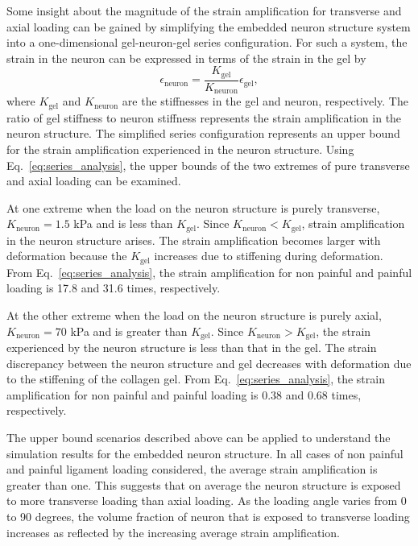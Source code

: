 \documentclass[]{interact}
\begin{document}
Some insight about the magnitude of the strain amplification for transverse and axial loading can be gained by simplifying the embedded neuron structure system into a one-dimensional gel-neuron-gel series configuration. For such a system, the strain in the neuron can be expressed in terms of the strain in the gel by
%
\begin{equation}
\epsilon_{\text{neuron}} = \frac{K_{\text{gel}}}{K_{\text{neuron}}}\epsilon_{\text{gel}},
\label{eq:series_analysis}
\end{equation}
%
where $K_{\text{gel}}$ and $K_{\text{neuron}}$ are the stiffnesses in the gel and neuron, respectively. The ratio of gel stiffness to neuron stiffness represents the strain amplification in the neuron structure. The simplified series configuration represents an upper bound for the strain amplification experienced in the neuron structure. Using Eq.\ \ref{eq:series_analysis}, the upper bounds of the two extremes of pure transverse and axial loading can be examined. 

At one extreme when the load on the neuron structure is purely transverse, $K_{\text{neuron}} = 1.5$ kPa and is less than $K_{\text{gel}}$. Since $K_{\text{neuron}} < K_{\text{gel}}$, strain amplification in the neuron structure arises. The strain amplification becomes larger with deformation because the $K_{\text{gel}}$ increases due to stiffening during deformation. From Eq.\ \eqref{eq:series_analysis}, the strain amplification for non painful and painful loading is 17.8 and 31.6 times, respectively.

At the other extreme when the load on the neuron structure is purely axial, $K_{\text{neuron}} = 70$ kPa and is greater than $K_{\text{gel}}$. Since $K_{\text{neuron}} > K_{\text{gel}}$, the strain experienced by the neuron structure is less than that in the gel. The strain discrepancy between the neuron structure and gel decreases with deformation due to the stiffening of the collagen gel. From Eq.\ \eqref{eq:series_analysis}, the strain amplification for non painful and painful loading is 0.38 and 0.68 times, respectively.

The upper bound scenarios described above can be applied to understand the simulation results for the embedded neuron structure. In all cases of non painful and painful ligament loading considered, the average strain amplification is greater than one. This suggests that on average the neuron structure is exposed to more transverse loading than axial loading. As the loading angle varies from 0 to 90 degrees, the volume fraction of neuron that is exposed to transverse loading increases as reflected by the increasing average strain amplification.
\end{document}
